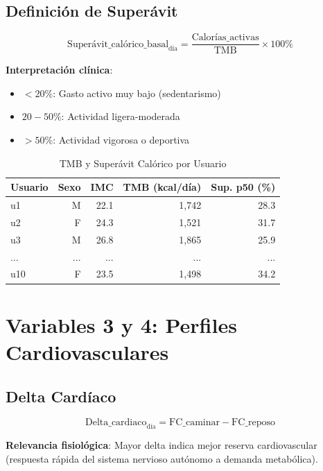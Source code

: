 \documentclass[12pt,letterpaper,twoside]{report}
\begin{document}
\subsection{Definición de Superávit}

\begin{equation}
\text{Superávit\_calórico\_basal}_{\text{día}} = \frac{\text{Calorías\_activas}}{\text{TMB}} \times 100\%
\end{equation}

\textbf{Interpretación clínica}:
\begin{itemize}[noitemsep]
    \item $<20\%$: Gasto activo muy bajo (sedentarismo)
    \item $20-50\%$: Actividad ligera-moderada
    \item $>50\%$: Actividad vigorosa o deportiva
\end{itemize}

\begin{table}[H]
\centering
\caption{TMB y Superávit Calórico por Usuario}
\label{tab:tmb_surplus}
\begin{tabular}{@{}lrrrr@{}}
\toprule
\textbf{Usuario} & \textbf{Sexo} & \textbf{IMC} & \textbf{TMB (kcal/día)} & \textbf{Sup. p50 (\%)} \\
\midrule
u1  & M & 22.1 & 1,742 & 28.3 \\
u2  & F & 24.3 & 1,521 & 31.7 \\
u3  & M & 26.8 & 1,865 & 25.9 \\
... & ...& ... & ... & ... \\
u10 & F & 23.5 & 1,498 & 34.2 \\
\bottomrule
\end{tabular}
\end{table}

\section{Variables 3 y 4: Perfiles Cardiovasculares}

\subsection{Delta Cardíaco}

\begin{equation}
\text{Delta\_cardiaco}_{\text{día}} = \text{FC\_caminar} - \text{FC\_reposo}
\end{equation}

\textbf{Relevancia fisiológica}: Mayor delta indica mejor reserva cardiovascular (respuesta rápida del sistema nervioso autónomo a demanda metabólica).
\end{document}
